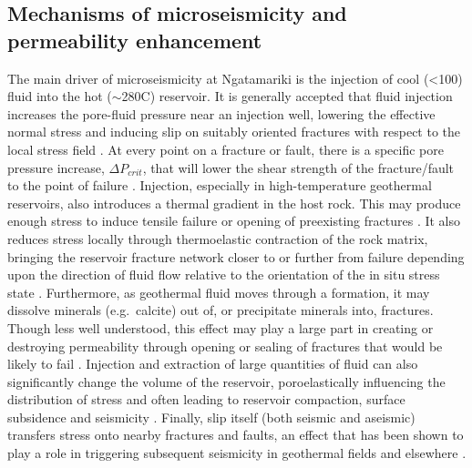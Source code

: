 \subsection{Mechanisms of microseismicity and permeability enhancement}
The main driver of microseismicity at Ngatamariki is the injection of cool (\textless{100}) fluid into the hot ($\sim$280\textdegree C) reservoir. It is generally accepted that fluid injection increases the pore-fluid pressure near an injection well, lowering the effective normal stress and inducing slip on suitably oriented fractures with respect to the local stress field \citep[e.g.][]{Zoback_1997,Ellsworth_2013,Langenbruch_2018}. At every point on a fracture or fault, there is a specific pore pressure increase, $\Delta{P_{crit}}$, that will lower the shear strength of the fracture\slash{fault} to the point of failure \citep{Wiprut_2000}. Injection, especially in high-temperature geothermal reservoirs, also introduces a thermal gradient in the host rock. This may produce enough stress to induce tensile failure or opening of preexisting fractures \citep{Mart_nez_Garz_n_2014}. It also reduces stress locally through thermoelastic contraction of the rock matrix, bringing the reservoir fracture network closer to or further from failure depending upon the direction of fluid flow relative to the orientation of the in situ stress state \citep{Jeanne_2014}. Furthermore, as geothermal fluid moves through a formation, it may dissolve minerals (e.g.\ calcite) out of, or precipitate minerals into, fractures. Though less well understood, this effect may play a large part in creating or destroying \gls{permeability} through opening or sealing of fractures that would be likely to fail \citep{Clearwater_2015}. Injection and extraction of large quantities of fluid can also significantly change the volume of the reservoir, poroelastically influencing the distribution of stress and often leading to reservoir compaction, surface subsidence and seismicity \citep{Segall_1989,Segall_1998,Bromley_2013}. Finally, slip itself (both seismic and aseismic) transfers stress onto nearby fractures and faults, an effect that has been shown to play a role in triggering subsequent seismicity in geothermal fields and elsewhere \citep{Schoenball_2012,Catalli_2016}.

